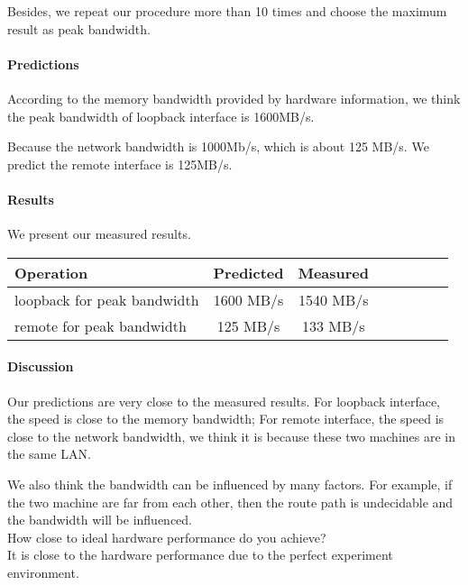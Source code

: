 Besides, we repeat our procedure more than 10 times and choose the maximum result as peak bandwidth.

\paragraph{Predictions}
According to the memory bandwidth provided by hardware information, we think the peak bandwidth of loopback interface is 1600MB/s. 

Because the network bandwidth is 1000Mb/s, which is about 125 MB/s. We predict the remote interface is 125MB/s.

\paragraph{Results}
We present our measured results.

\begin{center}
\begin{tabular}{l*{6}{c}r}
Operation       &  Predicted & Measured\\
\hline
loopback for peak bandwidth & 1600 MB/s & 1540 MB/s \\
remote for peak bandwidth & 125 MB/s  & 133 MB/s\\
\end{tabular}
\end{center}


\paragraph{Discussion}
Our predictions are very close to the measured results. For loopback interface, the speed is close to the memory bandwidth; For remote interface, the speed is close to the network bandwidth, we think it is because these two machines are in the same LAN.

We also think the bandwidth can be influenced by many factors. For example, if the two machine are far from each other, then the route path is undecidable and the bandwidth will be influenced. \\

How close to ideal hardware performance do you achieve? \\ 
It is close to the hardware performance due to the perfect experiment environment.
